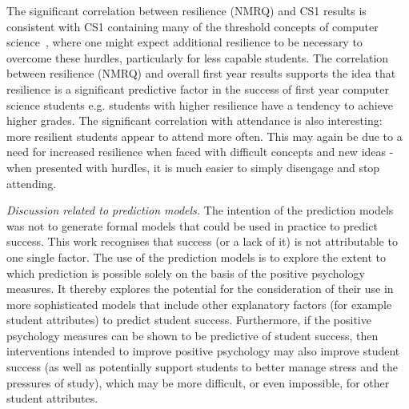 \documentclass[sigconf]{acmart}
\begin{document}
The significant correlation between resilience (NMRQ) and CS1 results is consistent with CS1 containing many of the threshold concepts of computer science~\cite{Sanders:2016:TCC:2999541.2999546}, where one might expect additional resilience to be necessary to overcome these hurdles, particularly for less capable students.  The correlation between resilience (NMRQ) and overall first year results supports the idea that resilience is a significant predictive factor in the success of first year computer science students e.g. students with higher resilience have a tendency to achieve higher grades. The significant correlation with attendance is also interesting: more resilient students appear to attend more often. This may again be due to a need for increased resilience when faced with difficult concepts and new ideas - when presented with hurdles, it is much easier to simply disengage and stop attending.
 
{\em Discussion related to prediction models. }
The intention of the prediction models was not to generate formal models that could be used in practice to predict success. This work recognises that success (or a lack of it) is not attributable to one single factor. The use of the prediction models is to explore the extent to which prediction is possible solely on the basis of the positive psychology measures.  It thereby explores the potential for the consideration of their use in more sophisticated models that include other explanatory factors (for example student attributes) to predict student success. Furthermore, if the positive psychology measures can be shown to be predictive of student success, then interventions intended to improve positive psychology may also improve student success (as well as potentially support students to better manage stress and the pressures of study), which may be more difficult, or even impossible, for other student attributes.
\end{document}
